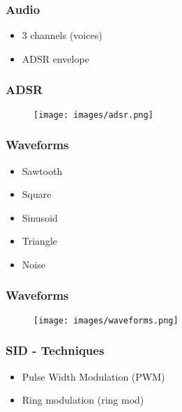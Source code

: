 
\begin{frame}
\frametitle{Audio}

\begin{itemize}
\item 3 channels (voices)
\item ADSR envelope
\end{itemize}

\end{frame}


\begin{frame}
\frametitle{ADSR}

\begin{figure}
\texttt{[image: images/adsr.png]}
\end{figure}

\end{frame}


\begin{frame}
\frametitle{Waveforms}

\begin{itemize}
\item Sawtooth
\item Square
\item Sinusoid
\item Triangle
\item Noise
\end{itemize}

\end{frame}


\begin{frame}
\frametitle{Waveforms}

\begin{figure}
\texttt{[image: images/waveforms.png]}
\end{figure}

\end{frame}


\begin{frame}
\frametitle{SID - Techniques}

\begin{itemize}
\item Pulse Width Modulation (PWM)
\item Ring modulation (ring mod)
\end{itemize}

\end{frame}

